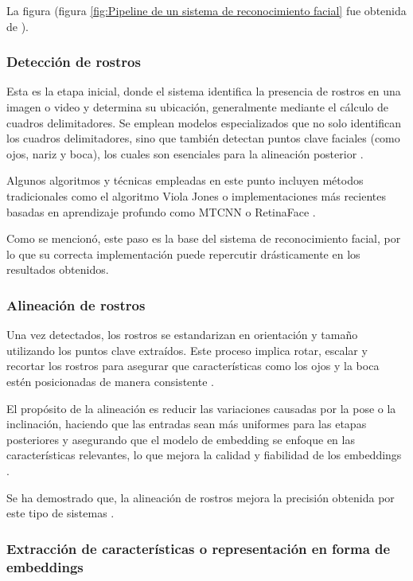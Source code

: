 La figura (figura \ref{fig:Pipeline de un sistema de reconocimiento facial} fue obtenida de \cite{Face_OpenCV}).

\subsubsection{Detección de rostros}

Esta es la etapa inicial, donde el sistema identifica la presencia de rostros en una imagen o video y determina su ubicación, generalmente mediante el cálculo de cuadros delimitadores. Se emplean modelos especializados que no solo identifican los cuadros delimitadores, sino que también detectan puntos clave faciales (como ojos, nariz y boca), los cuales son esenciales para la alineación posterior \cite{L16}.

Algunos algoritmos y técnicas empleadas en este punto incluyen métodos tradicionales como el algoritmo Viola Jones o implementaciones más recientes basadas en aprendizaje profundo como MTCNN o RetinaFace \cite{L14}.

Como se mencionó, este paso es la base del sistema de reconocimiento facial, por lo que su correcta implementación puede repercutir drásticamente en los resultados obtenidos.


\subsubsection{Alineación de rostros}

Una vez detectados, los rostros se estandarizan en orientación y tamaño utilizando los puntos clave extraídos. Este proceso implica rotar, escalar y recortar los rostros para asegurar que características como los ojos y la boca estén posicionadas de manera consistente \cite{Face_OpenCV}.

El propósito de la alineación es reducir las variaciones causadas por la pose o la inclinación, haciendo que las entradas sean más uniformes para las etapas posteriores y asegurando que el modelo de embedding se enfoque en las características relevantes, lo que mejora la calidad y fiabilidad de los embeddings \cite{L16}.

Se ha demostrado que, la alineación de rostros mejora la precisión obtenida por este tipo de sistemas \cite{Face_OpenCV}.

\subsubsection{Extracción de características o representación en forma de embeddings}

